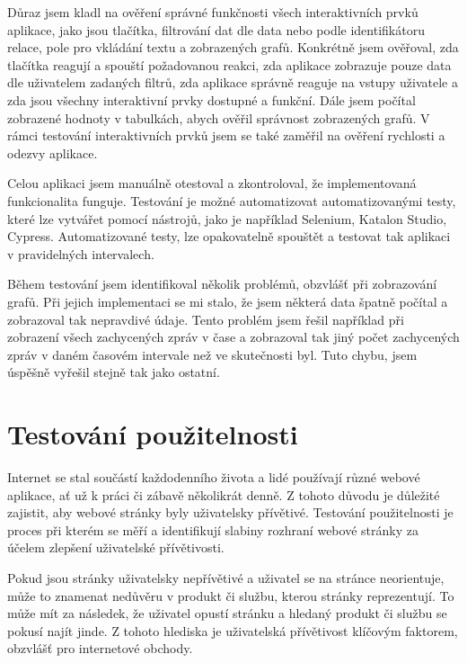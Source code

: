 Důraz jsem kladl na ověření správné funkčnosti všech interaktivních prvků aplikace, jako jsou tlačítka, filtrování dat dle data nebo podle identifikátoru relace, pole pro vkládání textu a zobrazených grafů. Konkrétně jsem ověřoval, zda tlačítka reagují a spouští požadovanou reakci, zda aplikace zobrazuje pouze data dle uživatelem zadaných filtrů, zda aplikace správně reaguje na vstupy uživatele a zda jsou všechny interaktivní prvky dostupné a funkční. Dále jsem počítal zobrazené hodnoty v tabulkách, abych ověřil správnost zobrazených grafů. V rámci testování interaktivních prvků jsem se také zaměřil na ověření rychlosti a odezvy aplikace.


Celou aplikaci jsem manuálně otestoval a zkontroloval, že implementovaná funkcionalita funguje. Testování je možné automatizovat automatizovanými testy, které lze vytvářet pomocí nástrojů, jako je například Selenium, Katalon Studio, Cypress. Automatizované testy, lze opakovatelně spouštět a testovat tak aplikaci v pravidelných intervalech.


Během testování jsem identifikoval několik problémů, obzvlášť při zobrazování grafů. Při jejich implementaci se mi stalo, že jsem některá data špatně počítal a zobrazoval tak nepravdivé údaje. Tento problém jsem řešil například při zobrazení všech zachycených zpráv v čase a zobrazoval tak jiný počet zachycených zpráv v daném časovém intervale než ve skutečnosti byl. Tuto chybu, jsem úspěšně vyřešil stejně tak jako ostatní.

\section{Testování použitelnosti}
    Internet se stal součástí každodenního života a lidé používají různé webové aplikace, ať už k práci či zábavě několikrát denně. Z tohoto důvodu je důležité zajistit, aby webové stránky byly uživatelsky přívětivé. Testování použitelnosti je proces při kterém se měří a identifikují slabiny rozhraní webové stránky za účelem zlepšení uživatelské přívětivosti.
    
    Pokud jsou stránky uživatelsky nepřívětivé a uživatel se na stránce neorientuje, může to znamenat nedůvěru v produkt či službu, kterou stránky reprezentují. To může mít za následek, že uživatel opustí stránku a hledaný produkt či službu se pokusí najít jinde. Z tohoto hlediska je uživatelská přívětivost klíčovým faktorem, obzvlášť pro internetové obchody. 
    
